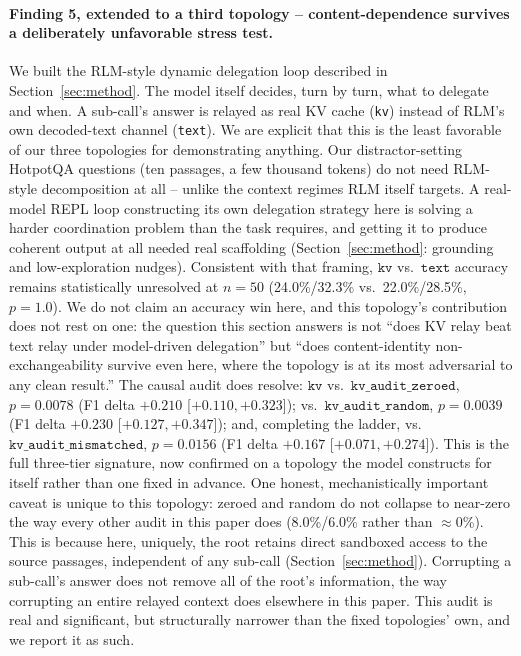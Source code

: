 \documentclass[11pt]{article}
\begin{document}
\paragraph{Finding 5, extended to a third topology -- content-dependence
survives a deliberately unfavorable stress test.} We built the RLM-style
dynamic delegation loop described in Section~\ref{sec:method}. The model
itself decides, turn by turn, what to delegate and when. A sub-call's
answer is relayed as real KV cache (\texttt{kv}) instead of RLM's own
decoded-text channel (\texttt{text}). We are explicit that this is the
least favorable of our three topologies for demonstrating anything. Our
distractor-setting HotpotQA questions (ten passages, a few thousand
tokens) do not need RLM-style decomposition at all -- unlike the context
regimes RLM itself targets. A real-model REPL loop constructing its own
delegation strategy here is solving a harder coordination problem than
the task requires, and getting it to produce coherent output at all
needed real scaffolding (Section~\ref{sec:method}: grounding and
low-exploration nudges). Consistent with that framing, $\texttt{kv}$
vs.\ $\texttt{text}$ accuracy remains statistically unresolved at $n=50$
(24.0\%/32.3\% vs.\ 22.0\%/28.5\%, $p=1.0$). We do not claim an accuracy
win here, and this topology's contribution does not rest on one: the
question this section answers is not ``does KV relay beat text relay
under model-driven delegation'' but ``does content-identity
non-exchangeability survive even here, where the topology is at its most
adversarial to any clean result.'' The causal audit does resolve:
$\texttt{kv}$ vs.\ $\texttt{kv\_audit\_zeroed}$, $p=0.0078$ (F1 delta
$+0.210$ [$+0.110,+0.323$]); vs.\ $\texttt{kv\_audit\_random}$,
$p=0.0039$ (F1 delta $+0.230$ [$+0.127,+0.347$]); and, completing the
ladder, vs.\ $\texttt{kv\_audit\_mismatched}$, $p=0.0156$ (F1 delta
$+0.167$ [$+0.071,+0.274$]). This is the full three-tier signature, now
confirmed on a topology the model constructs for itself rather than one
fixed in advance. One honest, mechanistically important caveat is
unique to this topology: zeroed and random do not collapse to
near-zero the way every other audit in this paper does (8.0\%/6.0\%
rather than $\approx$0\%). This is because here, uniquely, the root
retains direct sandboxed access to the source passages, independent of
any sub-call (Section~\ref{sec:method}). Corrupting a sub-call's answer
does not remove all of the root's information, the way corrupting an
entire relayed context does elsewhere in this paper. This audit is real
and significant, but structurally narrower than the fixed topologies'
own, and we report it as such.
\end{document}
